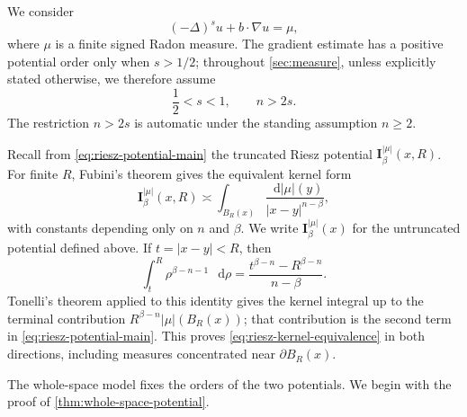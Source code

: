 \documentclass[10pt,a4paper]{amsart}
\numberwithin{equation}{section}
\newcommand{\I}{\mathbf I}
\newcommand{\differential}{\mathop{}\!\mathrm d}
\begin{document}
We consider
\begin{equation}\label{eq:measure-equation}
 (-\Delta)^s u+b\cdot\nabla u=\mu,
\end{equation}
where $\mu$ is a finite signed Radon measure.  The gradient estimate has a
positive potential order only when $s>1/2$; throughout
\cref{sec:measure}, unless explicitly stated otherwise, we therefore assume
\[
 \frac12<s<1,\qquad n>2s.
\]
The restriction $n>2s$ is automatic under the standing assumption $n\ge2$.

Recall from \eqref{eq:riesz-potential-main} the truncated Riesz
potential $\I_\beta^{|\mu|}(x,R)$.
For finite $R$, Fubini's theorem gives the equivalent kernel form
\begin{equation}\label{eq:riesz-kernel-equivalence}
 \I_\beta^{|\mu|}(x,R)
 \asymp
 \int_{B_R(x)}\frac{\differential|\mu|(y)}{|x-y|^{n-\beta}},
\end{equation}
with constants depending only on $n$ and $\beta$.  We write
$\I_\beta^{|\mu|}(x)$ for the untruncated potential defined above.
If $t=|x-y|<R$, then
\[
 \int_t^R\rho^{\beta-n-1}\,\differential\rho
 =\frac{t^{\beta-n}-R^{\beta-n}}{n-\beta}.
\]
Tonelli's theorem applied to this identity gives the kernel integral up to
the terminal contribution $R^{\beta-n}|\mu|(B_R(x))$; that contribution is
the second term in \eqref{eq:riesz-potential-main}.  This proves
\eqref{eq:riesz-kernel-equivalence} in both directions, including measures
concentrated near $\partial B_R(x)$.

The whole-space model fixes the orders of the two potentials.  We begin with
the proof of \cref{thm:whole-space-potential}.
\end{document}
